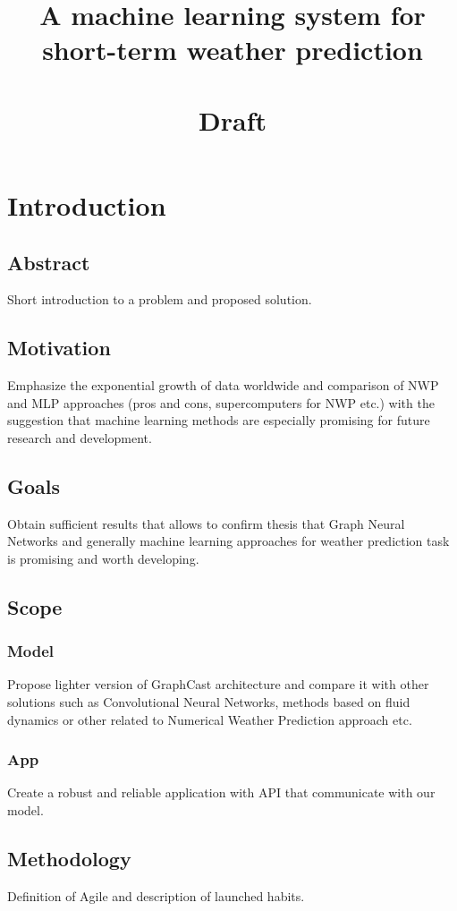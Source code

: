 \documentclass{article}
\title{%
	A machine learning system for short-term weather prediction \\ \, \\
	\large Draft}
\begin{document}
	\maketitle 
	
     \section{Introduction}
	
    \subsection{Abstract}
	Short introduction to a problem and proposed solution.
	\subsection{Motivation}
	Emphasize the exponential growth of data worldwide and comparison of NWP and MLP approaches (pros and cons, supercomputers for NWP etc.) with the suggestion that machine learning methods are especially promising for future research and development.
	\subsection{Goals}
	Obtain sufficient results that allows to confirm thesis that Graph Neural Networks and generally machine learning approaches for weather prediction task is promising and worth developing.
	\subsection{Scope}
	\subsubsection{Model}
	Propose lighter version of GraphCast architecture and compare it with other solutions such as Convolutional Neural Networks, methods based on fluid dynamics or other related to Numerical Weather Prediction approach etc.
	\subsubsection{App}
	Create a robust and reliable application with API that communicate with our model.
	\subsection{Methodology}
	Definition of Agile and description of launched habits. 
	
\end{document}

